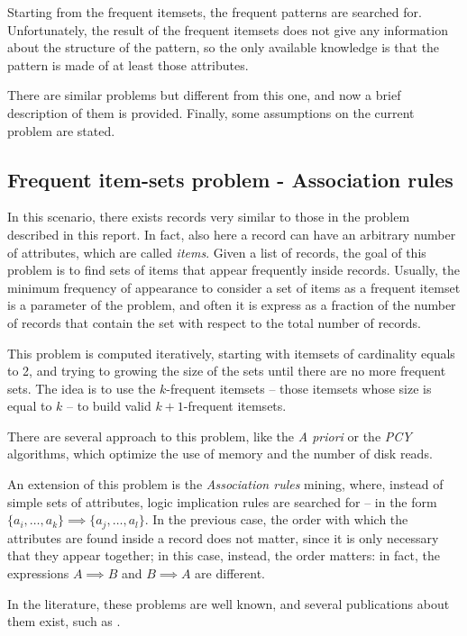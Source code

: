 \documentclass{acm_proc_article-sp-sigmod09}
\begin{document}
Starting from the frequent itemsets, the frequent patterns are searched for. Unfortunately, the result of the frequent itemsets does not give any information about the structure of the pattern, so the only available knowledge is that the pattern is made of at least those attributes.

There are similar problems but different from this one, and now a brief description of them is provided. Finally, some assumptions on the current problem are stated.

\subsection{Frequent item-sets problem - Association rules}
\label{sec:freqitemset}
In this scenario, there exists records very similar to those in the problem described in this report. In fact, also here a record can have an arbitrary number of attributes, which are called \emph{items}. Given a list of records, the goal of this problem is to find sets of items that appear frequently inside records. Usually, the minimum frequency of appearance to consider a set of items as a frequent itemset is a parameter of the problem, and often it is express as a fraction of the number of records that contain the set with respect to the total number of records.

This problem is computed iteratively, starting with itemsets of cardinality equals to 2, and trying to growing the size of the sets until there are no more frequent sets. The idea is to use the $k$-frequent itemsets -- those itemsets whose size is equal to $k$ -- to build valid $k + 1$-frequent itemsets.

There are several approach to this problem, like the \emph{A priori} or the \emph{PCY} algorithms, which optimize the use of memory and the number of disk reads.

An extension of this problem is the \emph{Association rules} mining, where, instead of simple sets of attributes, logic implication rules are searched for -- in the form $\{a_i, \dotsc, a_k\} \implies \{a_j, \dotsc, a_l\}$. In the previous case, the order with which the attributes are found inside a record does not matter, since it is only necessary that they appear together; in this case, instead, the order matters: in fact, the expressions $A \implies B$ and $B \implies A$ are different.

In the literature, these problems are well known, and several publications about them exist, such as \cite{agrawal1994fast, ivancsy2006time, rakesh1993mining, brin1997dynamic}.
\end{document}
